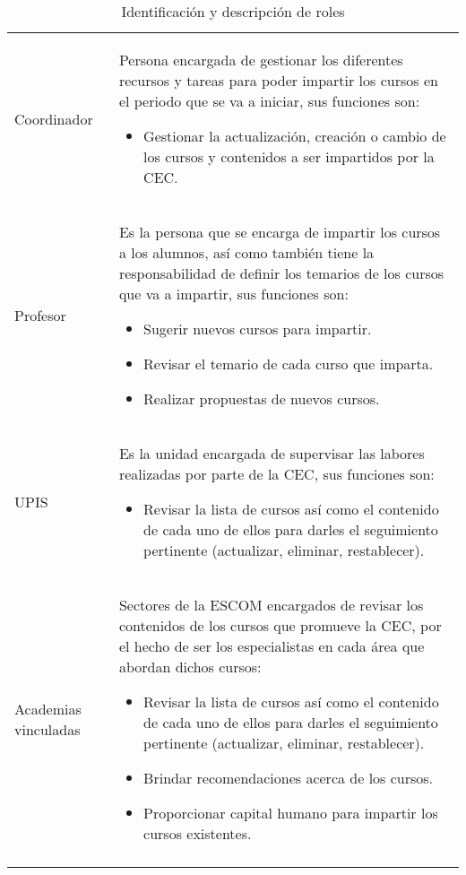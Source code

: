 \begin{longtable}{|p{5cm}|p{11cm}|}
{}\\ %
		\hline
		{Coordinador} & {Persona encargada de gestionar los diferentes recursos y tareas para poder impartir los cursos en el periodo que se va a iniciar, sus funciones son:
			\begin{itemize}
				\item Gestionar la actualización, creación o cambio de los cursos y contenidos a ser impartidos por la CEC.
			\end{itemize}
			}\\
		\hline
		{Profesor} & {Es la persona que se encarga de impartir los cursos a los alumnos, así como también tiene la responsabilidad de definir los temarios de los cursos que va a impartir, sus funciones son:
		\begin{itemize}
			\item Sugerir nuevos cursos para impartir.
			\item Revisar el temario de cada curso que imparta.
			\item Realizar propuestas de nuevos cursos.
		\end{itemize}}\\\hline
				{UPIS} & {Es la unidad encargada de supervisar las labores realizadas por parte de la CEC, sus funciones son:
		\begin{itemize}
			\item Revisar la lista de cursos así como el contenido de cada uno de ellos para darles el seguimiento pertinente (actualizar, eliminar, restablecer).
		\end{itemize}}\\\hline
				{Academias vinculadas} & {Sectores de la ESCOM encargados de revisar los contenidos de los cursos que promueve la CEC, por el hecho de ser los especialistas en cada área que abordan dichos cursos:
		\begin{itemize}
			\item Revisar la lista de cursos así como el contenido de cada uno de ellos para darles el seguimiento pertinente (actualizar, eliminar, restablecer).
			\item Brindar recomendaciones acerca de los cursos.
			\item Proporcionar capital humano para impartir los cursos existentes.
		\end{itemize}}\\\hline
\caption{Identificación y descripción de roles}
\end{longtable}
